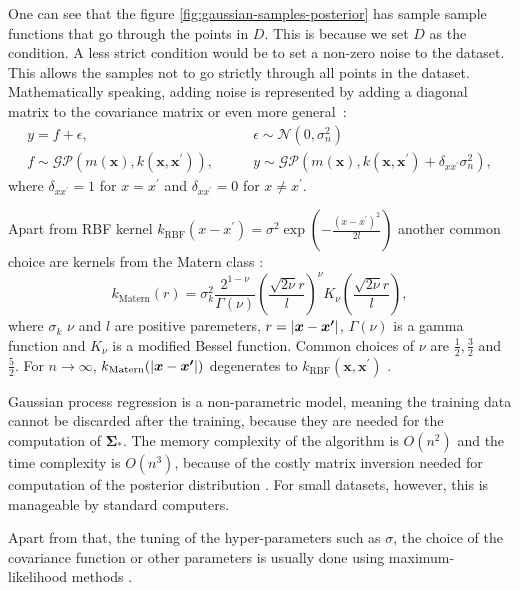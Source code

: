 One can see that the figure \ref{fig:gaussian-samples-posterior} has sample sample functions that go through the points in $D$. This is because we set $D$ as the condition. A less strict condition would be to set a non-zero noise to the dataset. This allows the samples not to go strictly through all points in the dataset. Mathematically speaking, adding noise is represented by adding a diagonal matrix to the covariance matrix or even more general~\cite{rasmussen2004}:
\begin{equation}
	\begin{split}
		y = f + \epsilon,& \quad  \quad \epsilon \sim \mathcal{N}(0, \sigma_n^2) \\
		f \sim \mathcal{GP}(m(\bm{x}),k(\bm{x},\bm{x}^\prime)), & \quad  \quad y \sim \mathcal{GP}(m(\bm{x}),k(\bm{x},\bm{x}^\prime)+\delta_{xx^\prime}\sigma_n^2),
	\end{split}
\end{equation}
where $\delta_{xx^\prime} = 1$ for $x=x^\prime$ and $\delta_{xx^\prime} = 0$ for $x\neq x^\prime$.

Apart from RBF kernel $k_{\mathrm{RBF}}(x-x^\prime) =\sigma^2\exp(-\frac{(x-x^\prime)^2}{2l})$ another common choice are kernels from the Matern class \cite{rasmussen2005}:
\begin{equation}
	\label{eq:mattern-kernel}
	k_\mathrm{Matern}(r) = \sigma_k^2\frac{2^{1-\nu}}{\Gamma(\nu)}\left(\frac{\sqrt{2\nu}r}{l}\right)^\nu K_\nu\left(\frac{\sqrt{2\nu}r}{l}\right),
\end{equation}
where $\sigma_k$ $\nu$ and $l$ are positive paremeters, $r=\lvert \bm{x} -\bm{x^\prime} \rvert$, $\Gamma(\nu)$ is a gamma function and $K_\nu$ is a modified Bessel function. Common choices of $\nu$ are $\frac{1}{2}, \frac{3}{2}$ and $\frac{5}{2}$. For $n \rightarrow \infty$, $k_\mathrm{Matern}(\lvert \bm{x} -\bm{x^\prime} \rvert)$ degenerates to $k_{\mathrm{RBF}}(\bm{x} ,\bm{x^\prime})$ \cite{rasmussen2005}.

Gaussian process regression is a non-parametric model, meaning the training data cannot be discarded after the training, because they are needed for the computation of $\bm{\Sigma_*}$. The memory complexity of the algorithm is $O(n^2)$ and the time complexity is $O(n^3)$, because of the costly matrix inversion needed for computation of the posterior distribution \cite{rasmussen2004}. For small datasets, however, this is manageable by standard computers.

Apart from that, the tuning of the hyper-parameters such as $\sigma$, the choice of the covariance function or other parameters is usually done using maximum-likelihood methods \cite{rasmussen2004}.

